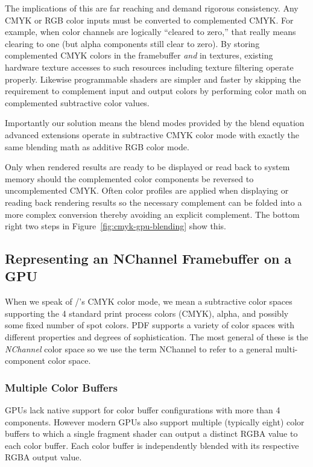 The implications of this are far reaching and demand rigorous consistency.
Any CMYK or RGB color inputs must be converted to
complemented CMYK. 
For example, when color channels are logically ``cleared to zero,'' that really means clearing to one (but alpha
components still clear to zero).
By storing complemented CMYK colors in the framebuffer {\em and} in textures,
existing hardware texture accesses to such resources including texture filtering operate properly.
Likewise programmable
shaders are simpler and faster by skipping the requirement to complement input and output colors
by performing color math
on complemented subtractive color values.

Importantly our solution means the blend modes provided by the blend
equation advanced extensions operate in subtractive CMYK color mode
with exactly the same blending math as additive RGB color mode.

Only when rendered results are ready to be displayed or read back to
system memory should the complemented color components be reversed to uncomplemented CMYK.
Often color profiles are applied when displaying
or reading back rendering results so the necessary complement can be folded into a more complex conversion
thereby avoiding an explicit complement.  The bottom right two steps in Figure~\ref{fig:cmyk-gpu-blending} show this.

\subsection{Representing an NChannel Framebuffer on a GPU}
\label{sec:representing-cmyk}

When we speak of \Illustrator/'s CMYK color mode,
we mean a subtractive color spaces supporting the 4 standard print
process colors (CMYK), alpha, and possibly some fixed number of spot colors.  PDF supports
a variety of color spaces with different properties and degrees of sophistication.
The most general of these is the {\em NChannel}
color space so we use the term NChannel to refer to a general multi-component color space.

\subsubsection{Multiple Color Buffers}
\label{sec:multiplebuffers}

GPUs lack native support for color buffer configurations with more than 4 components.
However modern GPUs also support multiple (typically eight) color buffers to which a single
fragment shader can output a distinct RGBA value to each color buffer.  Each color buffer
is independently blended with its respective RGBA output value.

